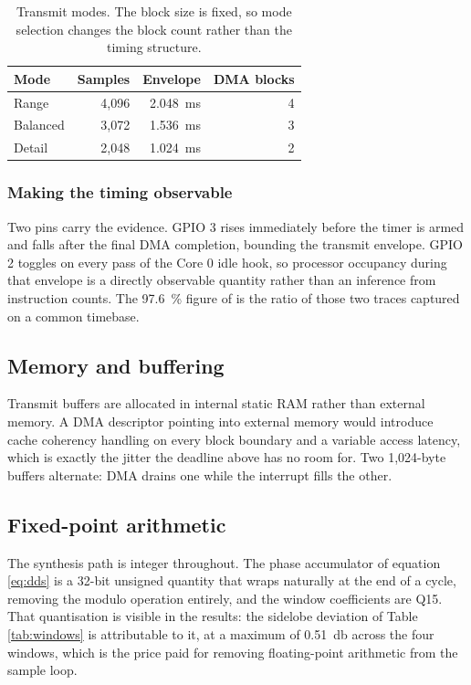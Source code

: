 \documentclass[11pt,a4paper]{article}
\begin{document}
\begin{table}[htbp]
\centering
\small
\begin{tabular}{lrrr}
\toprule
\textbf{Mode} & \textbf{Samples} & \textbf{Envelope} & \textbf{DMA blocks} \\
\midrule
Range & 4{,}096 & \SI{2.048}{\milli\second} & 4 \\
Balanced & 3{,}072 & \SI{1.536}{\milli\second} & 3 \\
Detail & 2{,}048 & \SI{1.024}{\milli\second} & 2 \\
\bottomrule
\end{tabular}
\caption{Transmit modes. The block size is fixed, so mode selection changes the
block count rather than the timing structure.}
\label{tab:txmodes}
\end{table}

\subsubsection{Making the timing observable}

Two pins carry the evidence. GPIO 3 rises immediately before the timer is armed
and falls after the final DMA completion, bounding the transmit envelope. GPIO 2
toggles on every pass of the Core 0 idle hook, so processor occupancy during
that envelope is a directly observable quantity rather than an inference from
instruction counts. The \SI{97.6}{\percent} figure of  is the ratio of
those two traces captured on a common timebase.

\subsection{Memory and buffering}

Transmit buffers are allocated in internal static RAM rather than external
memory. A DMA descriptor pointing into external memory would introduce cache
coherency handling on every block boundary and a variable access latency, which
is exactly the jitter the deadline above has no room for. Two 1{,}024-byte
buffers alternate: DMA drains one while the interrupt fills the other.

\subsection{Fixed-point arithmetic}

The synthesis path is integer throughout. The phase accumulator of equation
\eqref{eq:dds} is a 32-bit unsigned quantity that wraps naturally at the end of
a cycle, removing the modulo operation entirely, and the window coefficients are
Q15. That quantisation is visible in the results: the sidelobe deviation of
Table \ref{tab:windows} is attributable to it, at a maximum of
\SI{0.51}{\decibel} across the four windows, which is the price paid for
removing floating-point arithmetic from the sample loop.
\end{document}
